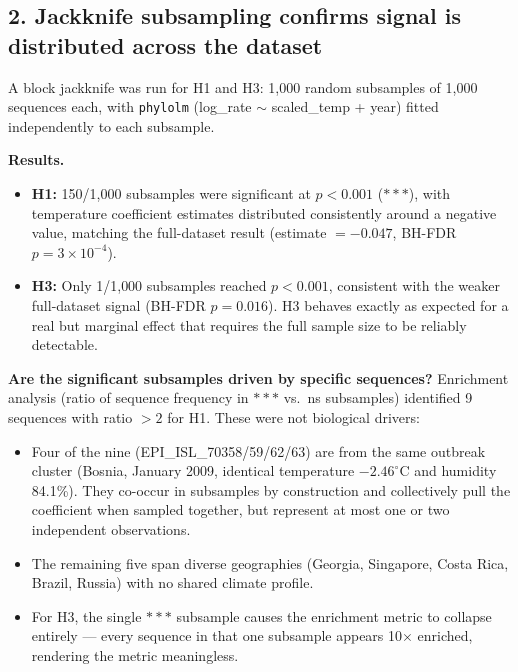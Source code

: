\documentclass[11pt, a4paper]{article}
\begin{document}
\subsection*{2. Jackknife subsampling confirms signal is distributed across
the dataset}

A block jackknife was run for H1 and H3: 1{,}000 random subsamples of 1{,}000
sequences each, with \texttt{phylolm} (log\_rate $\sim$ scaled\_temp +
year) fitted independently to each subsample.

\textbf{Results.}
\begin{itemize}
  \item \textbf{H1:} 150/1{,}000 subsamples were significant at $p < 0.001$
        ($***$), with temperature coefficient estimates distributed
        consistently around a negative value, matching the full-dataset
        result (estimate $= -0.047$, BH-FDR $p = 3 \times 10^{-4}$).
  \item \textbf{H3:} Only 1/1{,}000 subsamples reached $p < 0.001$, consistent
        with the weaker full-dataset signal (BH-FDR $p = 0.016$).
        H3 behaves exactly as expected for a real but marginal effect that
        requires the full sample size to be reliably detectable.
\end{itemize}

\textbf{Are the significant subsamples driven by specific sequences?}
Enrichment analysis (ratio of sequence frequency in $***$ vs.\ ns subsamples)
identified 9 sequences with ratio $> 2$ for H1. These were not biological
drivers:
\begin{itemize}
  \item Four of the nine (EPI\_ISL\_70358/59/62/63) are from the same outbreak
        cluster (Bosnia, January 2009, identical temperature $-2.46^\circ$C and
        humidity 84.1\%). They co-occur in subsamples by construction and
        collectively pull the coefficient when sampled together, but represent
        at most one or two independent observations.
  \item The remaining five span diverse geographies (Georgia, Singapore,
        Costa Rica, Brazil, Russia) with no shared climate profile.
  \item For H3, the single $***$ subsample causes the enrichment metric to
        collapse entirely --- every sequence in that one subsample appears
        10$\times$ enriched, rendering the metric meaningless.
\end{itemize}
\end{document}
